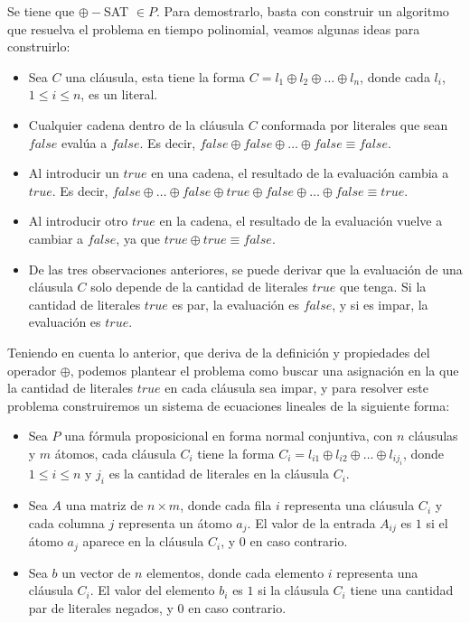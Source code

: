 \documentclass[letterpaper, 12pt]{article}
\begin{document}
\begin{enumerate}
Se tiene que $\oplus-$SAT $\in P$. Para demostrarlo, basta con construir un algoritmo que resuelva el problema en tiempo polinomial, veamos algunas ideas para construirlo:
\begin{itemize}
    \item Sea $C$ una cláusula, esta tiene la forma $C = l_1 \oplus l_2 \oplus \dots \oplus l_n$, donde cada $l_i$, $1 \leq i \leq n$, es un literal.
    \item Cualquier cadena dentro de la cláusula $C$ conformada por literales que sean $false$ evalúa a $false$. Es decir, $false \oplus false \oplus \dots \oplus false \equiv false$.
    \item Al introducir un $true$ en una cadena, el resultado de la evaluación cambia a $true$. Es decir, $false \oplus \dots \oplus false \oplus true \oplus false \oplus \dots \oplus false \equiv true$.
    \item Al introducir otro $true$ en la cadena, el resultado de la evaluación vuelve a cambiar a $false$, ya que $true \oplus true \equiv false$.
    \item De las tres observaciones anteriores, se puede derivar que la evaluación de una cláusula $C$ solo depende de la cantidad de literales $true$ que tenga. Si la cantidad de literales $true$ es par, la evaluación es $false$, y si es impar, la evaluación es $true$.
\end{itemize}

Teniendo en cuenta lo anterior, que deriva de la definición y propiedades del operador $\oplus$, podemos plantear el problema como buscar una asignación en la que la cantidad de literales $true$ en cada cláusula sea impar, y para resolver este problema construiremos un sistema de ecuaciones lineales de la siguiente forma:

\begin{itemize}
    \item Sea $P$ una fórmula proposicional en forma normal conjuntiva, con $n$ cláusulas y $m$ átomos, cada cláusula $C_i$ tiene la forma $C_i = l_{i1} \oplus l_{i2} \oplus \dots \oplus l_{ij_i}$, donde $1 \leq i \leq n$ y $j_i$ es la cantidad de literales en la cláusula $C_i$.
    \item Sea $A$ una matriz de $n \times m$, donde cada fila $i$ representa una cláusula $C_i$ y cada columna $j$ representa un átomo $a_j$. El valor de la entrada $A_{ij}$ es $1$ si el átomo $a_j$ aparece en la cláusula $C_i$, y $0$ en caso contrario.
    \item Sea $b$ un vector de $n$ elementos, donde cada elemento $i$ representa una cláusula $C_i$. El valor del elemento $b_i$ es $1$ si la cláusula $C_i$ tiene una cantidad par de literales negados, y $0$ en caso contrario.
\end{itemize}

\end{enumerate} \vspace{4mm}
\end{document}
